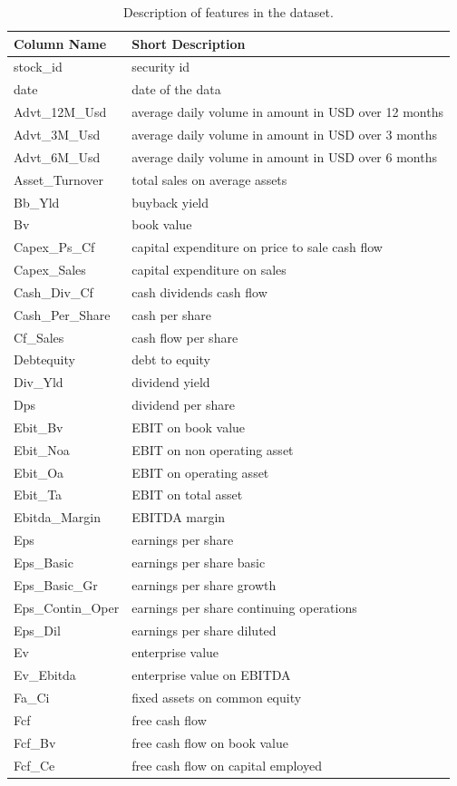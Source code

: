 \documentclass[]{krantz}
\theoremstyle{definition}
\theoremstyle{definition}
\theoremstyle{definition}
\theoremstyle{remark}
\begin{document}
\begin{table}
\begin{center}
\begin{tabular}{l l}
\textbf{Column Name}    &   \textbf{Short Description}  \\ \hline
stock\_id   &   security id \\
date    &   date of the data    \\
Advt\_12M\_Usd  &   average daily volume in amount in USD over 12 months    \\
Advt\_3M\_Usd   &   average daily volume in amount in USD over 3 months \\
Advt\_6M\_Usd   &   average daily volume in amount in USD over 6 months \\
Asset\_Turnover &   total sales on average assets   \\
Bb\_Yld &   buyback yield   \\
Bv  &   book value  \\
Capex\_Ps\_Cf   &   capital expenditure on price to sale cash flow  \\
Capex\_Sales    &   capital expenditure on sales    \\
Cash\_Div\_Cf   &   cash dividends cash flow    \\
Cash\_Per\_Share    &   cash per share  \\
Cf\_Sales   &   cash flow per share \\
Debtequity  &   debt to equity  \\
Div\_Yld    &   dividend yield  \\
Dps &   dividend per share  \\
Ebit\_Bv    &   EBIT on book value  \\
Ebit\_Noa   &   EBIT on non operating asset \\
Ebit\_Oa    &   EBIT on operating asset \\
Ebit\_Ta    &   EBIT on total asset \\
Ebitda\_Margin  &   EBITDA margin   \\
Eps &   earnings per share  \\
Eps\_Basic  &   earnings per share basic    \\
Eps\_Basic\_Gr  &   earnings per share growth   \\
Eps\_Contin\_Oper   &   earnings per share continuing operations    \\
Eps\_Dil    &   earnings per share diluted  \\
Ev  &   enterprise value    \\
Ev\_Ebitda  &   enterprise value on EBITDA  \\
Fa\_Ci  &   fixed assets on common equity   \\
Fcf &   free cash flow  \\
Fcf\_Bv &   free cash flow on book value    \\
Fcf\_Ce &   free cash flow on capital employed  \\ \hline
\end{tabular}
\end{center}
\caption{Description of features in the dataset. \label{tab:appendix1}}
\end{table}
\end{document}
